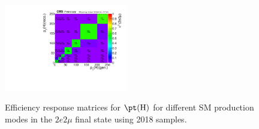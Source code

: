 \begin{figure}[htb]
\begin{center}
{    \includegraphics[width=0.48\textwidth,angle=0]{Figures/results/fiducial/2018//eff2d_WH_powheg_JHUgen_125_pT4l_2e2mu.pdf}
    \label{fig:eff-pT4l-2e2mu-maintext:d}
    } \\
    \caption{ Efficiency response matrices for $\pt({\rm H})$ for different SM production modes in the $2e2\mu$ final state using 2018 samples. }
    \label{fig:eff-pT4l-2e2mu-maintext}
  \end{center}
\end{figure} \clearpage

